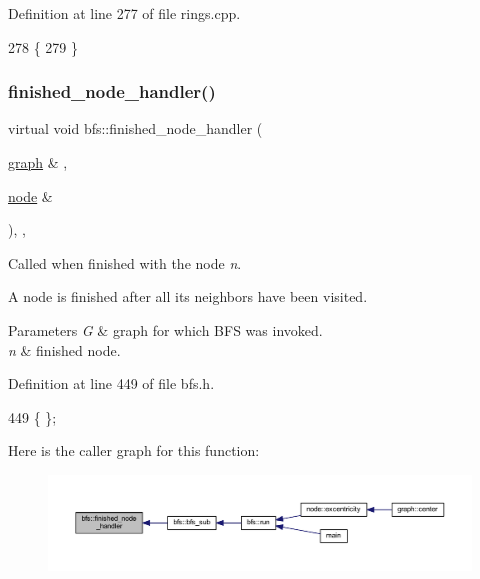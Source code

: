 Definition at line 277 of file rings.\+cpp.


\begin{DoxyCode}
278     \{
279     \}
\end{DoxyCode}
\mbox{\label{classbfs_a4d3f1d569910388b2ccece7cedd8bae4}} 
\subsubsection{\texorpdfstring{finished\+\_\+node\+\_\+handler()}{finished\_node\_handler()}}
{\footnotesize\ttfamily virtual void bfs\+::finished\+\_\+node\+\_\+handler (\begin{DoxyParamCaption}\item[{\mbox{\hyperlink{classgraph}{graph}} \&}]{,  }\item[{\mbox{\hyperlink{classnode}{node}} \&}]{ }\end{DoxyParamCaption})\hspace{0.3cm}{\ttfamily [inline]}, {\ttfamily [virtual]}, {\ttfamily [inherited]}}



Called when finished with the node {\itshape n}. 

A node is finished after all its neighbors have been visited.


\begin{DoxyParams}{Parameters}
{\em G} & graph for which B\+FS was invoked. \\
\hline
{\em n} & finished node. \\
\hline
\end{DoxyParams}


Definition at line 449 of file bfs.\+h.


\begin{DoxyCode}
449 \{ \};
\end{DoxyCode}
Here is the caller graph for this function\+:
\nopagebreak
\begin{figure}[H]
\begin{center}
\leavevmode
\includegraphics[width=350pt]{classbfs_a4d3f1d569910388b2ccece7cedd8bae4_icgraph}
\end{center}
\end{figure}
\mbox{\label{classbfs_a558582dd7a92ce3b3b512c523e589c23}} 
